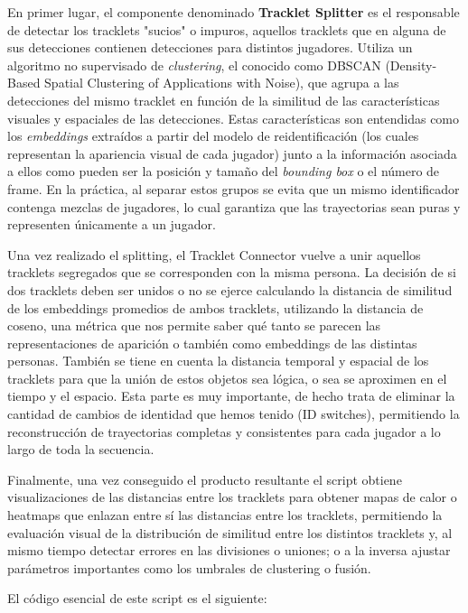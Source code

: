 \documentclass[12pt, a4paper, twoside]{article}
\begin{document}
	En primer lugar, el componente denominado \textbf{Tracklet Splitter} es el responsable de detectar los tracklets "sucios" o impuros, aquellos tracklets que en alguna de sus detecciones contienen detecciones para distintos jugadores. Utiliza un algoritmo no supervisado de \textit{clustering}, el conocido como DBSCAN (Density-Based Spatial Clustering of Applications with Noise), que agrupa a las detecciones del mismo tracklet en función de la similitud de las características visuales y espaciales de las detecciones. Estas características son entendidas como los \textit{embeddings} extraídos a partir del modelo de reidentificación (los cuales representan la apariencia visual de cada jugador) junto a la información asociada a ellos como pueden ser la posición y tamaño del \textit{bounding box} o el número de frame. En la práctica, al separar estos grupos se evita que un mismo identificador contenga mezclas de jugadores, lo cual garantiza que las trayectorias sean puras y representen únicamente a un jugador.
	
	Una vez realizado el splitting, el Tracklet Connector vuelve a unir aquellos tracklets segregados que se corresponden con la misma persona. La decisión de si dos tracklets deben ser unidos o no se ejerce calculando la distancia de similitud de los embeddings promedios de ambos tracklets, utilizando la distancia de coseno, una métrica que nos permite saber qué tanto se parecen las representaciones de aparición o también como embeddings de las distintas personas. También se tiene en cuenta la distancia temporal y espacial de los tracklets para que la unión de estos objetos sea lógica, o sea se aproximen en el tiempo y el espacio. Esta parte es muy importante, de hecho trata de eliminar la cantidad de cambios de identidad que hemos tenido (ID switches), permitiendo la reconstrucción de trayectorias completas y consistentes para cada jugador a lo largo de toda la secuencia.
	
	Finalmente, una vez conseguido el producto resultante el script obtiene visualizaciones de las distancias entre los tracklets para obtener mapas de calor o heatmaps que enlazan entre sí las distancias entre los tracklets, permitiendo la evaluación visual de la distribución de similitud entre los distintos tracklets y, al mismo tiempo detectar errores en las divisiones o uniones; o a la inversa ajustar parámetros importantes como los umbrales de clustering o fusión.
	
	
	El código esencial de este script es el siguiente:
	\vspace{0.5cm}
	
\end{document}
